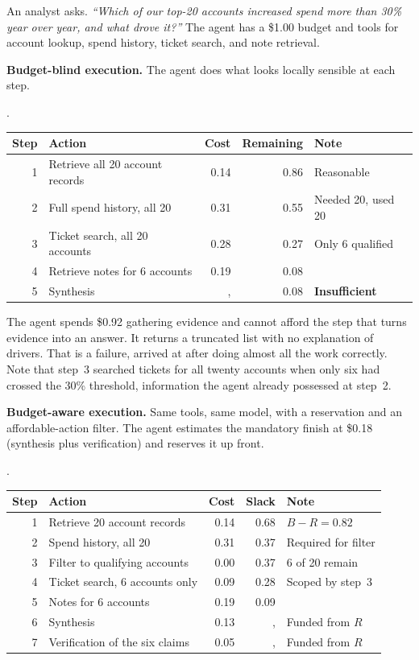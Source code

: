 An analyst asks. \emph{``Which of our top-20 accounts increased spend more than
30\% year over year, and what drove it?''} The agent has a \$1.00 budget and
tools for account lookup, spend history, ticket search, and note retrieval.

\textbf{Budget-blind execution.} The agent does what looks locally sensible at
each step.

\begin{center}.
\begin{tabular}{rlrrl}
\toprule
Step & Action & Cost & Remaining & Note \\
\midrule
1 & Retrieve all 20 account records & 0.14 & 0.86 & Reasonable \\
2 & Full spend history, all 20 & 0.31 & 0.55 & Needed 20, used 20 \\
3 & Ticket search, all 20 accounts & 0.28 & 0.27 & Only 6 qualified \\
4 & Retrieve notes for 6 accounts & 0.19 & 0.08 & \\
5 & Synthesis &, & 0.08 & \textbf{Insufficient} \\
\bottomrule
\end{tabular}
\end{center}

The agent spends \$0.92 gathering evidence and cannot afford the step that turns
evidence into an answer. It returns a truncated list with no explanation of drivers. That is a failure, arrived at after doing almost all the work correctly. Note that step~3
searched tickets for all twenty accounts when only six had crossed the 30\%
threshold, information the agent already possessed at step~2.

\textbf{Budget-aware execution.} Same tools, same model, with a reservation and
an affordable-action filter. The agent estimates the mandatory finish at \$0.18
(synthesis plus verification) and reserves it up front.

\begin{center}.
\begin{tabular}{rlrrl}
\toprule
Step & Action & Cost & Slack & Note \\
\midrule
1 & Retrieve 20 account records & 0.14 & 0.68 & $B{-}R = 0.82$ \\
2 & Spend history, all 20 & 0.31 & 0.37 & Required for filter \\
3 & Filter to qualifying accounts & 0.00 & 0.37 & 6 of 20 remain \\
4 & Ticket search, 6 accounts only & 0.09 & 0.28 & Scoped by step~3 \\
5 & Notes for 6 accounts & 0.19 & 0.09 & \\
6 & Synthesis & 0.13 &, & Funded from $R$ \\
7 & Verification of the six claims & 0.05 &, & Funded from $R$ \\
\bottomrule
\end{tabular}
\end{center}

